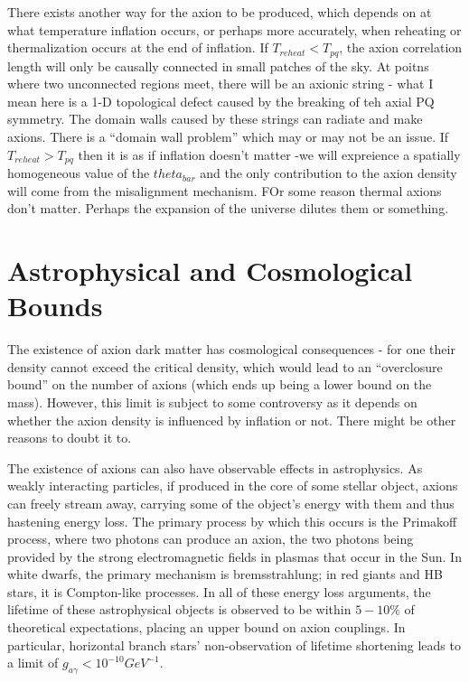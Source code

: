 \documentclass[11pt]{book}
\begin{document}
There exists another way for the axion to be produced, which depends on at what temperature inflation occurs, or perhaps more accurately, when reheating or thermalization occurs at the end of inflation. If $T_{reheat} < T_{pq}$, the axion correlation length will only be causally connected in small patches of the sky. At poitns where two unconnected regions meet, there will be an axionic string - what I mean here is a 1-D topological defect caused by the breaking of teh axial PQ symmetry. The domain walls caused by these strings can radiate and make axions. There is a “domain wall problem” which may or may not be an issue. If $T_{reheat} > T_{pq}$ then it is as if inflation doesn’t matter -we will expreience a spatially homogeneous value of the $theta_{bar}$ and the only contribution to the axion density will come from the misalignment mechanism. FOr some reason thermal axions don’t matter. Perhaps the expansion of the universe dilutes them or something.

\section{Astrophysical and Cosmological Bounds}
The existence of axion dark matter has cosmological consequences - for one their density cannot exceed the critical density, which would lead to an “overclosure bound” on the number of axions (which ends up being a lower bound on the mass). However, this limit is subject to some controversy as it depends on whether the axion density is influenced by inflation or not. There might be other reasons to doubt it to. 

The existence of axions can also have observable effects in astrophysics. As weakly interacting particles, if produced in the core of some stellar object, axions can freely stream away, carrying some of the object’s energy with them and thus hastening energy loss. The primary process by which this occurs is the Primakoff process, where two photons can produce an axion, the two photons being provided by the strong electromagnetic fields in plasmas that occur in the Sun. In white dwarfs, the primary mechanism is bremsstrahlung; in red giants and HB stars, it is Compton-like processes. In all of these energy loss arguments, the lifetime of these astrophysical objects is observed to be within $5-10\%$ of theoretical expectations, placing an upper bound on axion couplings. In particular, horizontal branch stars’ non-observation of lifetime shortening leads to a limit of $g_{a\gamma} < 10^{-10} GeV^{-1}$. 
\end{document}

